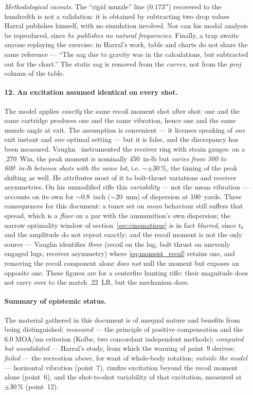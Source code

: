 \documentclass[12pt,a4paper]{article}
\begin{document}
	\emph{Methodological caveats.} The ``rigid muzzle'' line ($0.173''$) recovered to the hundredth is not a validation: it is obtained by subtracting two drop values Harral publishes himself, with no simulation involved. Nor can his modal analysis be reproduced, since \emph{he publishes no natural frequencies}. Finally, a trap awaits anyone replaying the exercise: in Harral's work, table and charts do not share the same reference --- ``The sag due to gravity was in the calculations, but subtracted out for the chart.'' The static sag is removed from the \emph{curves}, not from the \emph{proj} column of the table.

	\paragraph{12. An excitation assumed identical on every shot.} The model applies \emph{exactly} the same recoil moment shot after shot: one and the same cartridge produces one and the same vibration, hence one and the same muzzle angle at exit. The assumption is convenient --- it licenses speaking of \emph{one} exit instant and \emph{one} optimal setting --- but it is false, and the discrepancy has been measured. Vaughn~\cite{Vaughn} instrumented the receiver ring with strain gauges: on a .270~Win, the peak moment is nominally 450~in-lb but \emph{varies from 300 to 600~in-lb between shots with the same lot}, i.e. $\sim \pm 30\,\%$, the timing of the peak shifting as well. He attributes most of it to bolt-thrust variations and receiver asymmetries. On his unmodified rifle this \emph{variability} --- not the mean vibration --- accounts on its own for $\sim 0.8$~inch ($\sim 20$~mm) of dispersion at 100~yards. Three consequences for this document: a tuner set on \emph{mean} behaviour still suffers that spread, which is a \emph{floor} on a par with the ammunition's own dispersion; the narrow optimality window of section~\ref{sec:cinematique} is in fact \emph{blurred}, since $t_b$ and the amplitude do not repeat exactly; and the recoil moment is not the only source --- Vaughn identifies \emph{three} (recoil on the lug, bolt thrust on unevenly engaged lugs, receiver asymmetry) where \eqref{eq:moment_recul} retains one, and removing the recoil component alone \emph{does not} null the moment but exposes an opposite one. These figures are for a centerfire hunting rifle: their magnitude does not carry over to the match .22~LR, but the mechanism does.

	\paragraph{Summary of epistemic status.} The material gathered in this document is of unequal nature and benefits from being distinguished: \emph{measured} --- the principle of positive compensation and the 6.0 MOA/ms criterion (Kolbe, two concordant independent methods); \emph{computed but unvalidated} --- Harral's study, from which the warning of point~9 derives; \emph{failed} --- the recreation above, for want of whole-body rotation; \emph{outside the model} --- horizontal vibration (point~7), rimfire excitation beyond the recoil moment alone (point~6), and the shot-to-shot variability of that excitation, measured at $\pm 30\,\%$ (point~12).
\end{document}
